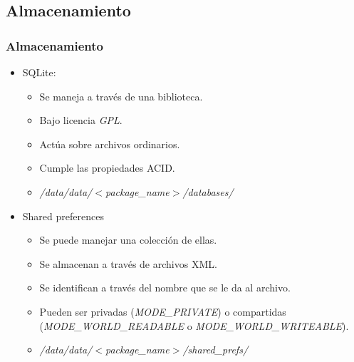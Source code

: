 \subsection{Almacenamiento}
\begin{frame}
  \frametitle{Almacenamiento}
  \begin{itemize}
      \item SQLite: 
      \begin{itemize}
    \item Se maneja a través de una biblioteca.
    
    \item Bajo licencia \textit{GPL}.
    
    \item Actúa sobre archivos ordinarios.

    \item Cumple las propiedades ACID.
    
    \item \textit{/data/data/$<$package\_name$>$/databases/}
      \end{itemize}
      
      \item Shared preferences
      \begin{itemize}
    \item Se puede manejar una colección de ellas.
    
    \item Se almacenan a través de archivos XML.
    
    \item Se identifican a través del nombre que se le da al archivo.
    
    \item Pueden ser privadas (\textit{MODE\_PRIVATE}) o compartidas (\textit{MODE\_WORLD\_READABLE} o \textit{MODE\_WORLD\_WRITEABLE}).
    
    \item \textit{/data/data/$<$package\_name$>$/shared\_prefs/}
      \end{itemize}
  \end{itemize}
\end{frame}

